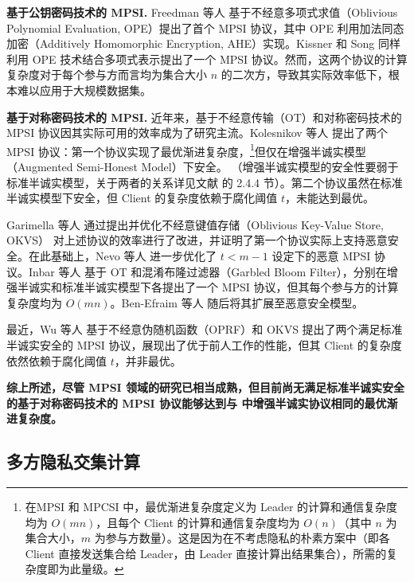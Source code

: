 \begin{trivlist}
\item \textbf{基于公钥密码技术的 MPSI.}
Freedman 等人 \cite{FreedmanNP04} 基于不经意多项式求值（Oblivious Polynomial Evaluation, OPE）提出了首个 MPSI 协议，其中 OPE 利用加法同态加密（Additively Homomorphic Encryption, AHE）实现。Kissner 和 Song \cite{KS-CRYPTO-2005} 同样利用 OPE 技术结合多项式表示提出了一个 MPSI 协议。然而，这两个协议的计算复杂度对于每个参与方而言均为集合大小 $n$ 的二次方，导致其实际效率低下，根本难以应用于大规模数据集。

\item \textbf{基于对称密码技术的 MPSI.}
近年来，基于不经意传输（OT）和对称密码技术的 MPSI 协议因其实际可用的效率成为了研究主流。Kolesnikov 等人 \cite{KMPRT-CCS-2017} 提出了两个 MPSI 协议：第一个协议实现了最优渐进复杂度，\footnote{在MPSI 和 MPCSI 中，最优渐进复杂度定义为 Leader 的计算和通信复杂度均为 $O(mn)$，且每个 Client 的计算和通信复杂度均为 $O(n)$（其中 $n$ 为集合大小，$m$ 为参与方数量）。这是因为在不考虑隐私的朴素方案中（即各 Client 直接发送集合给 Leader，由 Leader 直接计算出结果集合），所需的复杂度即为此量级。}但仅在增强半诚实模型（Augmented Semi-Honest Model）下安全。 （增强半诚实模型的安全性要弱于标准半诚实模型，关于两者的关系详见文献 \cite{HazayL10} 的 2.4.4 节）。第二个协议虽然在标准半诚实模型下安全，但 Client 的复杂度依赖于腐化阈值 $t$，未能达到最优。

Garimella 等人 \cite{GPRTY-CRYPTO-2021} 通过提出并优化不经意键值存储（Oblivious Key-Value Store, OKVS）\cite{PRTY20,RR-CCS-2022,BPSY-USENIX-2023} 对上述协议的效率进行了改进，并证明了第一个协议实际上支持恶意安全。在此基础上，Nevo 等人 \cite{NTY-CCS-2021} 进一步优化了 $t < m-1$ 设定下的恶意 MPSI 协议。Inbar 等人 \cite{InbarOP18} 基于 OT 和混淆布隆过滤器（Garbled Bloom Filter），分别在增强半诚实和标准半诚实模型下各提出了一个 MPSI 协议，但其每个参与方的计算复杂度均为 $O(mn)$。Ben-Efraim 等人 \cite{BNOP-AsiaCCS-2022} 随后将其扩展至恶意安全模型。

最近，Wu 等人 \cite{WuYC24} 基于不经意伪随机函数（OPRF）和 OKVS 提出了两个满足标准半诚实安全的 MPSI 协议，展现出了优于前人工作的性能，但其 Client 的复杂度依然依赖于腐化阈值 $t$，并非最优。
\end{trivlist}

\textbf{综上所述，尽管 MPSI 领域的研究已相当成熟，但目前尚无满足标准半诚实安全的基于对称密码技术的 MPSI 协议能够达到与 \cite{KMPRT-CCS-2017} 中增强半诚实协议相同的最优渐进复杂度。}

\subsection{多方隐私交集计算}

